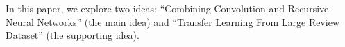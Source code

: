 In this paper, we explore two ideas: ``Combining Convolution and Recursive Neural Networks'' (the main idea) and ``Transfer Learning From Large Review Dataset'' (the supporting idea).
